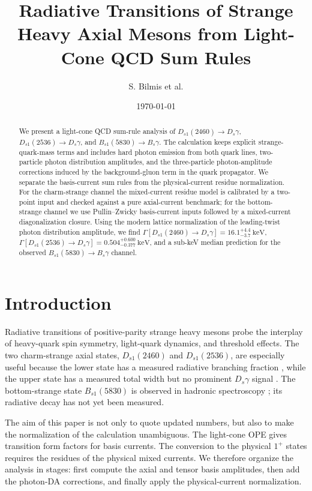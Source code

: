 \documentclass[11pt]{article}
\title{Radiative Transitions of Strange Heavy Axial Mesons from Light-Cone QCD Sum Rules}
\author{S. Bilmis et al.}
\date{\today}
\newcommand{\Ds}{D_s}
\newcommand{\Dsone}{D_{s1}}
\newcommand{\Bs}{B_s}
\newcommand{\Bsone}{B_{s1}}
\newcommand{\keV}{\mathrm{keV}}
\begin{document}
\maketitle

\begin{abstract}
We present a light-cone QCD sum-rule analysis of
$\Dsone(2460)\to\Ds\gamma$, $\Dsone(2536)\to\Ds\gamma$, and
$\Bsone(5830)\to\Bs\gamma$.  The calculation keeps explicit strange-quark-mass
terms and includes hard photon emission from both quark lines, two-particle
photon distribution amplitudes, and the three-particle photon-amplitude
corrections induced by the background-gluon term in the quark propagator.  We
separate the basis-current sum rules from the physical-current residue
normalization.  For the charm-strange channel the mixed-current residue model is
calibrated by a two-point input and checked against a pure axial-current
benchmark; for the bottom-strange channel we use Pullin--Zwicky basis-current
inputs followed by a mixed-current diagonalization closure.  Using the modern
lattice normalization of the
leading-twist photon distribution amplitude, we find
$\Gamma[\Dsone(2460)\to\Ds\gamma]=16.1^{+4.4}_{-3.7}~\keV$,
$\Gamma[\Dsone(2536)\to\Ds\gamma]=0.504^{+0.600}_{-0.377}~\keV$, and a sub-keV
median prediction for the observed $\Bsone(5830)\to\Bs\gamma$ channel.
\end{abstract}

\section{Introduction}

Radiative transitions of positive-parity strange heavy mesons probe the
interplay of heavy-quark spin symmetry, light-quark dynamics, and threshold
effects.  The two charm-strange axial states, $\Dsone(2460)$ and
$\Dsone(2536)$, are especially useful because the lower state has a measured
radiative branching fraction \cite{BaBar2006}, while the upper state has a
measured total width but no prominent $\Ds\gamma$ signal \cite{BaBar2011}.  The
bottom-strange state $\Bsone(5830)$ is observed in hadronic spectroscopy
\cite{CMS2018}; its radiative decay has not yet been measured.

The aim of this paper is not only to quote updated numbers, but also to make the
normalization of the calculation unambiguous.  The light-cone OPE gives
transition form factors for basis currents.  The conversion to the physical
$1^+$ states requires the residues of the physical mixed currents.  We therefore
organize the analysis in stages: first compute the axial and tensor basis
amplitudes, then add the photon-DA corrections, and finally apply the
physical-current normalization.
\end{document}
